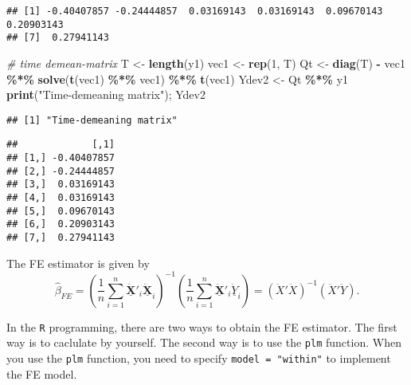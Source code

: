 \documentclass[
  12pt,
]{article}
\newenvironment{Shaded}{\begin{snugshade}}{\end{snugshade}}
\newcommand{\CommentTok}[1]{\textcolor[rgb]{0.56,0.35,0.01}{\textit{#1}}}
\newcommand{\DecValTok}[1]{\textcolor[rgb]{0.00,0.00,0.81}{#1}}
\newcommand{\KeywordTok}[1]{\textcolor[rgb]{0.13,0.29,0.53}{\textbf{#1}}}
\newcommand{\NormalTok}[1]{#1}
\newcommand{\OperatorTok}[1]{\textcolor[rgb]{0.81,0.36,0.00}{\textbf{#1}}}
\newcommand{\StringTok}[1]{\textcolor[rgb]{0.31,0.60,0.02}{#1}}
\begin{document}
\begin{verbatim}
## [1] -0.40407857 -0.24444857  0.03169143  0.03169143  0.09670143  0.20903143
## [7]  0.27941143
\end{verbatim}

\begin{Shaded}
\begin{Highlighting}[]
\CommentTok{\# time demean{-}matrix}
\NormalTok{T \textless{}{-}}\StringTok{ }\KeywordTok{length}\NormalTok{(y1)}
\NormalTok{vec1 \textless{}{-}}\StringTok{ }\KeywordTok{rep}\NormalTok{(}\DecValTok{1}\NormalTok{, T)}
\NormalTok{Qt \textless{}{-}}\StringTok{ }\KeywordTok{diag}\NormalTok{(T) }\OperatorTok{{-}}\StringTok{ }\NormalTok{vec1 }\OperatorTok{\%*\%}\StringTok{ }\KeywordTok{solve}\NormalTok{(}\KeywordTok{t}\NormalTok{(vec1) }\OperatorTok{\%*\%}\StringTok{ }\NormalTok{vec1) }\OperatorTok{\%*\%}\StringTok{ }\KeywordTok{t}\NormalTok{(vec1)}
\NormalTok{Ydev2 \textless{}{-}}\StringTok{ }\NormalTok{Qt }\OperatorTok{\%*\%}\StringTok{ }\NormalTok{y1}
\KeywordTok{print}\NormalTok{(}\StringTok{"Time{-}demeaning matrix"}\NormalTok{); Ydev2}
\end{Highlighting}
\end{Shaded}

\begin{verbatim}
## [1] "Time-demeaning matrix"
\end{verbatim}

\begin{verbatim}
##             [,1]
## [1,] -0.40407857
## [2,] -0.24444857
## [3,]  0.03169143
## [4,]  0.03169143
## [5,]  0.09670143
## [6,]  0.20903143
## [7,]  0.27941143
\end{verbatim}

The FE estimator is given by \[
  \hat{\beta}_{FE} = 
  \left( \frac{1}{n} \sum_{i=1}^n \ddot{\underline{\mathbf{X}}}'_i 
  \ddot{\underline{\mathbf{X}}}_i \right)^{-1}
  \left( \frac{1}{n} \sum_{i=1}^n \ddot{\underline{\mathbf{X}}}'_i \ddot{\underline{Y}}_i \right)
  = (\ddot{X}' \ddot{X})^{-1}(\ddot{X}' \ddot{Y}).
\]

In the \texttt{R} programming, there are two ways to obtain the FE
estimator. The first way is to caclulate by yourself. The second way is
to use the \texttt{plm} function. When you use the \texttt{plm}
function, you need to specify \texttt{model\ =\ "within"} to implement
the FE model.
\end{document}
